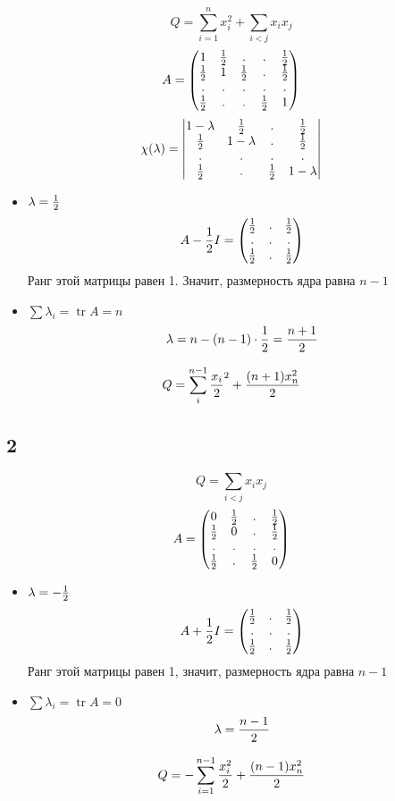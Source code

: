 $$ Q = \sum_{i = 1}^n x_i^2 + \sum_{i < j}x_ix_j $$
$$ A =
\begin{pmatrix}
	1 & \half & . & . & \half \\
    \half & 1 & \half & . & \half \\
    . & . & . & . & . \\
    \half & . & . & \half & 1
\end{pmatrix} $$
$$ \chi(\lambda) =
\begin{vmatrix}
	1 - \lambda & \half & . & \half \\
    \half & 1 - \lambda & . & \half \\
    . & . & . & . \\
    \half & . & \half & 1 - \lambda
\end{vmatrix} $$
\begin{itemize}
	\item $ \lambda = \half $
    $$ A - \half I =
    \begin{pmatrix}
    	\half & . & \half \\
        . & . & . \\
        \half & . & \half
    \end{pmatrix} $$
    Ранг этой матрицы равен 1. Значит, размерность ядра равна $ n - 1 $
    \item $ \sum \lambda_i = \operatorname{tr} A = n $
    $$ \lambda = n - (n - 1) \cdot \half = \half[n + 1] $$
\end{itemize}
$$ Q = \sum_i^{n - 1} \half[x_i]^2 + \half[(n + 1)x_n^2] $$

\subsection{2}

$$ Q = \sum_{i < j} x_ix_j $$
$$ A =
\begin{pmatrix}
	0 & \half & . & \half \\
    \half & 0 & . & \half \\
    . & . & . & . \\
    \half & . & \half & 0
\end{pmatrix} $$
\begin{itemize}
	\item $ \lambda = -\half $
    $$ A + \half I =
    \begin{pmatrix}
    	\half & . & \half \\
        . & . & . \\
        \half & . & \half
    \end{pmatrix} $$
    Ранг этой матрицы равен 1, значит, размерность ядра равна $ n - 1 $
    \item $ \sum \lambda_i = \operatorname{tr} A = 0 $
    $$ \lambda = \half[n - 1] $$
\end{itemize}
$$ Q = -\sum_{i = 1}^{n - 1} \half[x_i^2] + \half[(n - 1)x_n^2] $$


